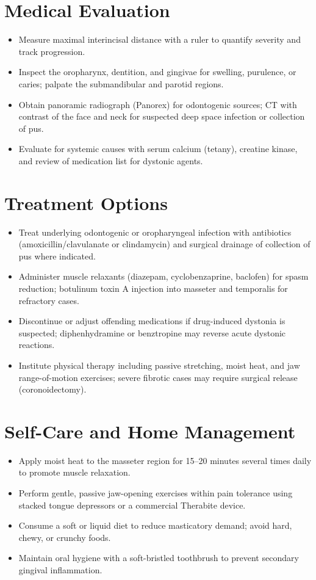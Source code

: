 \section*{Medical Evaluation}
\begin{itemize}
  \item Measure maximal interincisal distance with a ruler to quantify severity and track progression.
  \item Inspect the oropharynx, dentition, and gingivae for swelling, purulence, or caries; palpate the submandibular and parotid regions.
  \item Obtain panoramic radiograph (Panorex) for odontogenic sources; CT with contrast of the face and neck for suspected deep space infection or collection of pus.
  \item Evaluate for systemic causes with serum calcium (tetany), creatine kinase, and review of medication list for dystonic agents.
\end{itemize}

\section*{Treatment Options}
\begin{itemize}
  \item Treat underlying odontogenic or oropharyngeal infection with antibiotics (amoxicillin/clavulanate or clindamycin) and surgical drainage of collection of pus where indicated.
  \item Administer muscle relaxants (diazepam, cyclobenzaprine, baclofen) for spasm reduction; botulinum toxin A injection into masseter and temporalis for refractory cases.
  \item Discontinue or adjust offending medications if drug-induced dystonia is suspected; diphenhydramine or benztropine may reverse acute dystonic reactions.
  \item Institute physical therapy including passive stretching, moist heat, and jaw range-of-motion exercises; severe fibrotic cases may require surgical release (coronoidectomy).
\end{itemize}

\section*{Self-Care and Home Management}
\begin{itemize}
  \item Apply moist heat to the masseter region for 15--20 minutes several times daily to promote muscle relaxation.
  \item Perform gentle, passive jaw-opening exercises within pain tolerance using stacked tongue depressors or a commercial Therabite device.
  \item Consume a soft or liquid diet to reduce masticatory demand; avoid hard, chewy, or crunchy foods.
  \item Maintain oral hygiene with a soft-bristled toothbrush to prevent secondary gingival inflammation.
\end{itemize}

